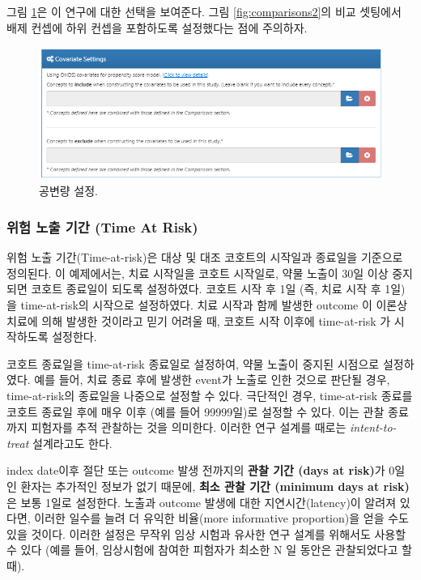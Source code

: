 \documentclass[11pt]{book}
\theoremstyle{definition}
\theoremstyle{definition}
\theoremstyle{definition}
\theoremstyle{remark}
\begin{document}
그림 \ref{fig:covariateSettings}은 이 연구에 대한 선택을 보여준다. 그림
\ref{fig:comparisons2}의 비교 셋팅에서 배제 컨셉에 하위 컨셉을
포함하도록 설정했다는 점에 주의하자.

\begin{figure}

{\centering \includegraphics[width=1\linewidth]{images/PopulationLevelEstimation/covariateSettings} 

}

\caption{공변량 설정.}\label{fig:covariateSettings}
\end{figure}

\subsubsection*{위험 노출 기간 (Time At Risk)}\label{---time-at-risk-1}

위험 노출 기간(Time-at-risk)은 대상 및 대조 코호트의 시작일과 종료일을
기준으로 정의된다. 이 예제에서는, 치료 시작일을 코호트 시작일로, 약물
노출이 30일 이상 중지되면 코호트 종료일이 되도록 설정하였다. 코호트 시작
후 1일 (즉, 치료 시작 후 1일) 을 time-at-risk의 시작으로 설정하였다.
치료 시작과 함께 발생한 outcome 이 이론상 치료에 의해 발생한 것이라고
믿기 어려울 때, 코호트 시작 이후에 time-at-risk 가 시작하도록 설정한다.

코호트 종료일을 time-at-risk 종료일로 설정하여, 약물 노출이 중지된
시점으로 설정하였다. 예를 들어, 치료 종료 후에 발생한 event가 노출로
인한 것으로 판단될 경우, time-at-risk의 종료일을 나중으로 설정할 수
있다. 극단적인 경우, time-at-risk 종료를 코호트 종료일 후에 매우 이후
(예를 들어 99999일)로 설정할 수 있다. 이는 관찰 종료까지 피험자를 추적
관찰하는 것을 의미한다. 이러한 연구 설계를 때로는 \emph{intent-to-treat}
설계라고도 한다.

index date이후 절단 또는 outcome 발생 전까지의 \textbf{관찰 기간 (days
at risk)}가 0일인 환자는 추가적인 정보가 없기 때문에, \textbf{최소 관찰
기간 (minimum days at risk)}은 보통 1일로 설정한다. 노출과 outcome
발생에 대한 지연시간(latency)이 알려져 있다면, 이러한 일수를 늘려 더
유익한 비율(more informative proportion)을 얻을 수도 있을 것이다. 이러한
설정은 무작위 임상 시험과 유사한 연구 설계를 위해서도 사용할 수 있다
(예를 들어, 임상시험에 참여한 피험자가 최소한 N 일 동안은 관찰되었다고
할 때).
\end{document}
